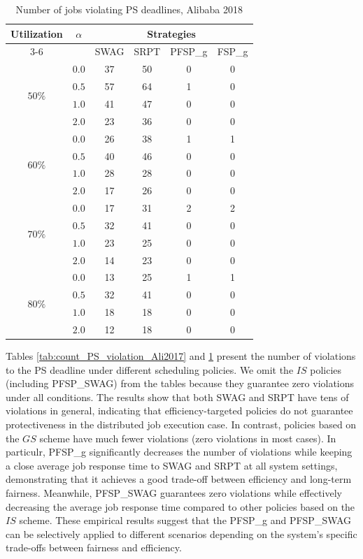 \begin{table}[htbp]
    \centering
    \caption{Number of jobs violating PS deadlines, Alibaba 2018}
    \label{tab:count_PS_violation_Ali2018}
    \begin{tabular}{cc cccc}
        \toprule
        \multirow{2}{*}{Utilization} & \multirow{2}{*}{$\alpha$} & \multicolumn{4}{c}{Strategies} \\
        \cmidrule(lr){3-6}
        & & SWAG & SRPT & PFSP\_g & FSP\_g \\
        \midrule
        \multirow{4}{*}{$50\%$} 
        & $0.0$ & 37 & 50 & 0 & 0 \\
        & $0.5$ & 57 & 64 & 1 & 0 \\
        & $1.0$ & 41 & 47 & 0 & 0 \\
        & $2.0$ & 23 & 36 & 0 & 0 \\
        \midrule
        \multirow{4}{*}{$60\%$} 
        & $0.0$ & 26 & 38 & 1 & 1 \\
        & $0.5$ & 40 & 46 & 0 & 0 \\
        & $1.0$ & 28 & 28 & 0 & 0 \\
        & $2.0$ & 17 & 26 & 0 & 0 \\
        \midrule
        \multirow{4}{*}{$70\%$} 
        & $0.0$ & 17 & 31 & 2 & 2 \\
        & $0.5$ & 32 & 41 & 0 & 0 \\
        & $1.0$ & 23 & 25 & 0 & 0 \\
        & $2.0$ & 14 & 23 & 0 & 0 \\
        \midrule
        \multirow{4}{*}{$80\%$} 
        & $0.0$ & 13 & 25 & 1 & 1 \\
        & $0.5$ & 32 & 41 & 0 & 0 \\
        & $1.0$ & 18 & 18 & 0 & 0 \\
        & $2.0$ & 12 & 18 & 0 & 0 \\
        \bottomrule
    \end{tabular}
\end{table}

Tables \ref{tab:count_PS_violation_Ali2017} and \ref{tab:count_PS_violation_Ali2018} present the number of violations to the PS deadline under different scheduling policies. We omit the $IS$ policies (including PFSP\_SWAG) from the tables because they guarantee zero violations under all conditions. The results show that both SWAG and SRPT have tens of violations in general, indicating that efficiency-targeted policies do not guarantee protectiveness in the distributed job execution case. In contrast, policies based on the $GS$ scheme have much fewer violations (zero violations in most cases). In particulr, PFSP\_g significantly decreases the number of violations while keeping a close average job response time to SWAG and SRPT at all system settings, demonstrating that it achieves a good trade-off between efficiency and long-term fairness. Meanwhile, PFSP\_SWAG guarantees zero violations while effectively decreasing the average job response time compared to other policies based on the $IS$ scheme. These empirical results suggest that the PFSP\_g and PFSP\_SWAG can be selectively applied to different scenarios depending on the system's specific trade-offs between fairness and efficiency.

